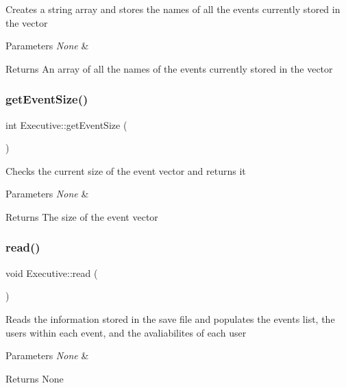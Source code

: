 Creates a string array and stores the names of all the events currently stored in the vector 
\begin{DoxyParams}{Parameters}
{\em None} & \\
\hline
\end{DoxyParams}
\begin{DoxyReturn}{Returns}
An array of all the names of the events currently stored in the vector 
\end{DoxyReturn}
\mbox{\label{class_executive_a325d611b8cd579647ee657c69560f28a}} 
\subsubsection{\texorpdfstring{get\+Event\+Size()}{getEventSize()}}
{\footnotesize\ttfamily int Executive\+::get\+Event\+Size (\begin{DoxyParamCaption}{ }\end{DoxyParamCaption})}

Checks the current size of the event vector and returns it 
\begin{DoxyParams}{Parameters}
{\em None} & \\
\hline
\end{DoxyParams}
\begin{DoxyReturn}{Returns}
The size of the event vector 
\end{DoxyReturn}
\mbox{\label{class_executive_a222ab3a86234f7476e769a285bf566a4}} 
\subsubsection{\texorpdfstring{read()}{read()}}
{\footnotesize\ttfamily void Executive\+::read (\begin{DoxyParamCaption}{ }\end{DoxyParamCaption})}

Reads the information stored in the save file and populates the events list, the users within each event, and the avaliabilites of each user 
\begin{DoxyParams}{Parameters}
{\em None} & \\
\hline
\end{DoxyParams}
\begin{DoxyReturn}{Returns}
None 
\end{DoxyReturn}
\mbox{\label{class_executive_a49841644378cd9bb4b8c1cc2eee04003}} 

